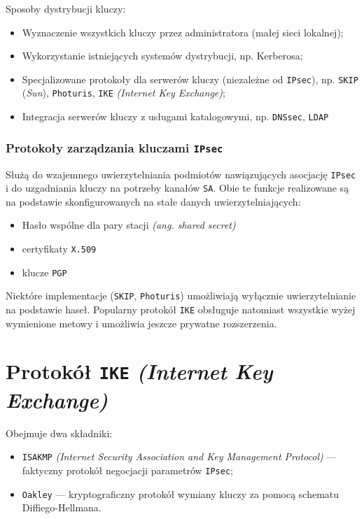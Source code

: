 \documentclass[a4paper]{article}
\begin{document}
Sposoby dystrybucji kluczy:
\begin{itemize}
  \item Wyznaczenie wszystkich kluczy przez administratora (małej sieci lokalnej);
  \item Wykorzystanie istniejących systemów dystrybucji, np. Kerberosa;
  \item Specjalizowane protokoły dla serwerów kluczy (niezależne od {\tt IPsec}), np. {\tt SKIP} (\emph{Sun}), {\tt Photuris}, {\tt IKE} \emph{(Internet Key Exchange)};
  \item Integracja serwerów kluczy z usługami katalogowymi, np. {\tt DNSsec}, {\tt LDAP}
\end{itemize}

\subsubsection{Protokoły zarządzania kluczami {\tt IPsec}}

Służą do wzajemnego uwierzytelniania podmiotów nawiązujących asocjację {\tt IPsec} i do uzgadniania kluczy na potrzeby kanałów {\tt SA}.
Obie te funkcje realizowane są na podstawie skonfigurowanych na stałe danych uwierzytelniających:
\begin{itemize}
  \item Hasło wspólne dla pary stacji \emph{(ang. shared secret)}
  \item certyfikaty {\tt X.509}
  \item klucze {\tt PGP}
\end{itemize}

Niektóre implementacje ({\tt SKIP}, {\tt Photuris}) umożliwiają wyłącznie uwierzytelnianie na podstawie haseł.
Popularny protokół {\tt IKE} obsługuje natomiast wszystkie wyżej wymienione metowy i umożliwia jeszcze prywatne rozszerzenia.

\section{Protokół {\tt IKE} \emph{(Internet Key Exchange)}}

Obejmuje dwa składniki:
\begin{itemize}
  \item {\tt ISAKMP} \emph{(Internet Security Association and Key Management Protocol)} --- faktyczny protokół negocjacji parametrów {\tt IPsec};
  \item {\tt Oakley} --- kryptograficzny protokół wymiany kluczy za pomocą schematu Diffiego-Hellmana.
\end{itemize}
\end{document}
